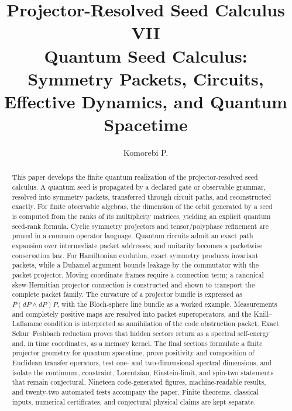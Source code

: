 \documentclass[11pt]{article}
\title{\textbf{Projector-Resolved Seed Calculus VII}\\[0.45em]
\large Quantum Seed Calculus: Symmetry Packets, Circuits, Effective Dynamics, and Quantum Spacetime}
\author{Komorebi P.}
\date{}
\theoremstyle{definition}
\theoremstyle{remark}
\begin{document}
\maketitle

\begin{abstract}
This paper develops the finite quantum realization of the projector-resolved seed calculus. A quantum seed is propagated by a declared gate or observable grammar, resolved into symmetry packets, transferred through circuit paths, and reconstructed exactly. For finite observable algebras, the dimension of the orbit generated by a seed is computed from the ranks of its multiplicity matrices, yielding an explicit quantum seed-rank formula. Cyclic symmetry projectors and tensor/polyphase refinement are proved in a common operator language. Quantum circuits admit an exact path expansion over intermediate packet addresses, and unitarity becomes a packetwise conservation law. For Hamiltonian evolution, exact symmetry produces invariant packets, while a Duhamel argument bounds leakage by the commutator with the packet projector. Moving coordinate frames require a connection term; a canonical skew-Hermitian projector connection is constructed and shown to transport the complete packet family. The curvature of a projector bundle is expressed as $P(dP\wedge dP)P$, with the Bloch-sphere line bundle as a worked example. Measurements and completely positive maps are resolved into packet superoperators, and the Knill--Laflamme condition is interpreted as annihilation of the code obstruction packet. Exact Schur--Feshbach reduction proves that hidden sectors return as a spectral self-energy and, in time coordinates, as a memory kernel. The final sections formulate a finite projector geometry for quantum spacetime, prove positivity and composition of Euclidean transfer operators, test one- and two-dimensional spectral dimensions, and isolate the continuum, constraint, Lorentzian, Einstein-limit, and spin-two statements that remain conjectural. Nineteen code-generated figures, machine-readable results, and twenty-two automated tests accompany the paper. Finite theorems, classical inputs, numerical certificates, and conjectural physical claims are kept separate.
\end{abstract}
\end{document}
